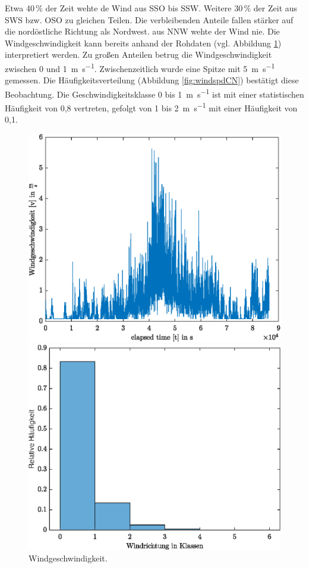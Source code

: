 Etwa 40\,\% der Zeit wehte de Wind aus SSO bis SSW. Weitere 30\,\% der Zeit aus SWS bzw. OSO zu gleichen Teilen. Die verbleibenden Anteile fallen stärker auf die nordöstliche Richtung als Nordwest. aus NNW wehte der Wind nie. Die Windgeschwindigkeit kann bereits anhand der Rohdaten (vgl. Abbildung \ref{fig:windspd}) interpretiert werden. Zu großen Anteilen betrug die Windgeschwindigkeit zwischen 0 und \SI{1}{\meter\per\second}. Zwischenzeitlich wurde eine Spitze mit \SI{5}{\meter\per\second} gemessen. Die Häufigkeitsverteilung (Abbildung \ref{fig:windspdCN}) bestätigt diese Beobachtung. Die Geschwindigkeitsklasse 0 bis \SI{1}{\meter\per\second} ist mit einer statistischen Häufigkeit von 0,8 vertreten, gefolgt von 1 bis \SI{2}{\meter\per\second} mit einer Häufigkeit von 0,1.
\begin{figure}[H]
	\centering
	\begin{minipage}[t]{0.4\textwidth}
	\centering
	\includegraphics[width=\textwidth]{../DATA/Windgeschwindigkeit.eps}
	\caption[Windgeschwindigkeit]{Windgeschwindigkeit.}
	\label{fig:windspd}
	\end{minipage}
\hfill
	\begin{minipage}[t]{0.4\textwidth}
	\centering
	\includegraphics[width=\textwidth]{../DATA/WindspdCN.eps}

\end{minipage}
\end{figure}
